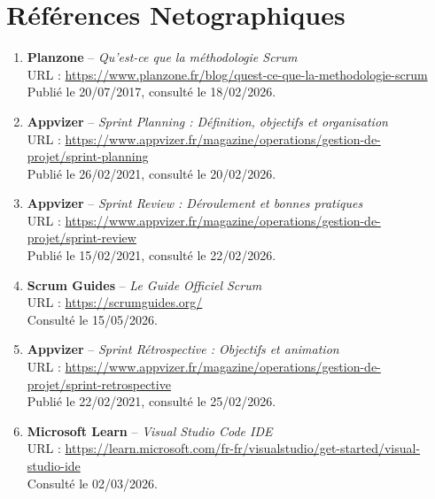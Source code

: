 \section*{Références Netographiques}
\begin{enumerate}
    \item \textbf{Planzone} -- \textit{Qu'est-ce que la méthodologie Scrum} \\
    URL : \href{https://www.planzone.fr/blog/quest-ce-que-la-methodologie-scrum}{https://www.planzone.fr/blog/quest-ce-que-la-methodologie-scrum} \\
    Publié le 20/07/2017, consulté le 18/02/2026.
    
    \item \textbf{Appvizer} -- \textit{Sprint Planning : Définition, objectifs et organisation} \\
    URL : \href{https://www.appvizer.fr/magazine/operations/gestion-de-projet/sprint-planning}{https://www.appvizer.fr/magazine/operations/gestion-de-projet/sprint-planning} \\
    Publié le 26/02/2021, consulté le 20/02/2026.
    
    \item \textbf{Appvizer} -- \textit{Sprint Review : Déroulement et bonnes pratiques} \\
    URL : \href{https://www.appvizer.fr/magazine/operations/gestion-de-projet/sprint-review}{https://www.appvizer.fr/magazine/operations/gestion-de-projet/sprint-review} \\
    Publié le 15/02/2021, consulté le 22/02/2026.
    
    \item \textbf{Scrum Guides} -- \textit{Le Guide Officiel Scrum} \\
    URL : \href{https://scrumguides.org/}{https://scrumguides.org/} \\
    Consulté le 15/05/2026.
    
    \item \textbf{Appvizer} -- \textit{Sprint Rétrospective : Objectifs et animation} \\
    URL : \href{https://www.appvizer.fr/magazine/operations/gestion-de-projet/sprint-retrospective}{https://www.appvizer.fr/magazine/operations/gestion-de-projet/sprint-retrospective} \\
    Publié le 22/02/2021, consulté le 25/02/2026.
    
    \item \textbf{Microsoft Learn} -- \textit{Visual Studio Code IDE} \\
    URL : \href{https://learn.microsoft.com/fr-fr/visualstudio/get-started/visual-studio-ide}{https://learn.microsoft.com/fr-fr/visualstudio/get-started/visual-studio-ide} \\
    Consulté le 02/03/2026.
    

\end{enumerate}
